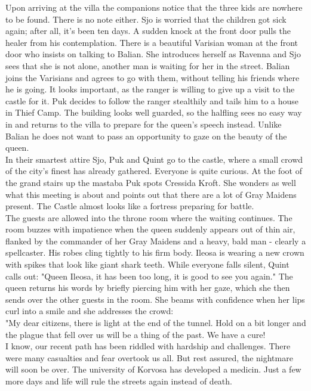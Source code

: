 Upon arriving at the villa the companions notice that the three kids are nowhere to be found. There is no note either. Sjo is worried that the children got sick again; after all, it's been ten days. A sudden knock at the front door pulls the healer from his contemplation. There is a beautiful Varisian woman at the front door who insists on talking to Balian. She introduces herself as Ravenna and Sjo sees that she is not alone, another man is waiting for her in the street. Balian joins the Varisians and agrees to go with them, without telling his friends where he is going. It looks important, as the ranger is willing to give up a visit to the castle for it. Puk decides to follow the ranger stealthily and tails him to a house in Thief Camp. The building looks well guarded, so the halfling sees no easy way in and returns to the villa to prepare for the queen's speech instead. Unlike Balian he does not want to pass an opportunity to gaze on the beauty of the queen.\\

In their smartest attire Sjo, Puk and Quint go to the castle, where a small crowd of the city's finest has already gathered. Everyone is quite curious. At the foot of the grand stairs up the mastaba Puk spots Cressida Kroft. She wonders as well what this meeting is about and points out that there are a lot of Gray Maidens present. The Castle almost looks like a fortress preparing for battle.\\

The guests are allowed into the throne room where the waiting continues. The room buzzes with impatience when the queen suddenly appears out of thin air, flanked by the commander of her Gray Maidens and a heavy, bald man - clearly a spellcaster. His robes cling tightly to his firm body. Ileosa is wearing a new crown with spikes that look like giant shark teeth. While everyone falls silent, Quint calls out: "Queen Ileosa, it has been too long, it is good to see you again." The queen returns his words by briefly piercing him with her gaze, which she then sends over the other guests in the room. She beams with confidence when her lips curl into a smile and she addresses the crowd:\\

"My dear citizens, there is light at the end of the tunnel. Hold on a bit longer and the plague that fell over us will be a thing of the past. We have a cure!\\

I know, our recent path has been riddled with hardship and challenges. There were many casualties and fear overtook us all. But rest assured, the nightmare will soon be over. The university of Korvosa has developed a medicin. Just a few more days and life will rule the streets again instead of death.\\

